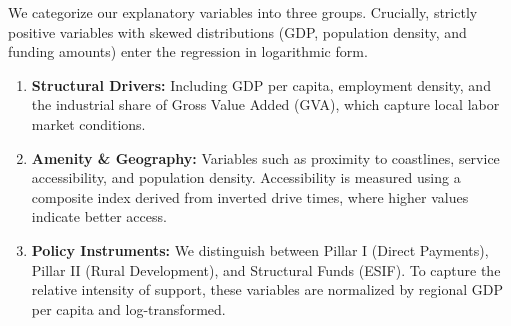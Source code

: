 \documentclass[
	a4paper, %
	10pt, %
]{LTJournalArticle}
\begin{document}
We categorize our explanatory variables into three groups. Crucially, strictly positive variables with skewed distributions (GDP, population density, and funding amounts) enter the regression in logarithmic form.
\begin{enumerate}
    \item \textbf{Structural Drivers:} Including GDP per capita, employment density, and the industrial share of Gross Value Added (GVA), which capture local labor market conditions.
    \item \textbf{Amenity \& Geography:} Variables such as proximity to coastlines, service accessibility, and population density. Accessibility is measured using a composite index derived from inverted drive times, where higher values indicate better access.
    \item \textbf{Policy Instruments:} We distinguish between Pillar I (Direct Payments), Pillar II (Rural Development), and Structural Funds (ESIF). To capture the relative intensity of support, these variables are normalized by regional GDP per capita and log-transformed.
\end{enumerate}
\end{document}
